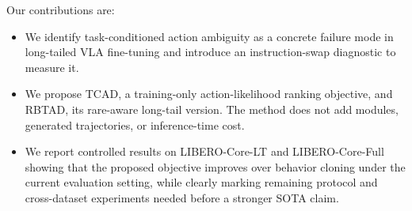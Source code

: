 Our contributions are:
\begin{itemize}[leftmargin=*]
  \item We identify task-conditioned action ambiguity as a concrete failure mode in long-tailed VLA fine-tuning and introduce an instruction-swap diagnostic to measure it.
  \item We propose TCAD, a training-only action-likelihood ranking objective, and RBTAD, its rare-aware long-tail version. The method does not add modules, generated trajectories, or inference-time cost.
  \item We report controlled results on LIBERO-Core-LT and LIBERO-Core-Full showing that the proposed objective improves over behavior cloning under the current evaluation setting, while clearly marking remaining protocol and cross-dataset experiments needed before a stronger SOTA claim.
\end{itemize}

